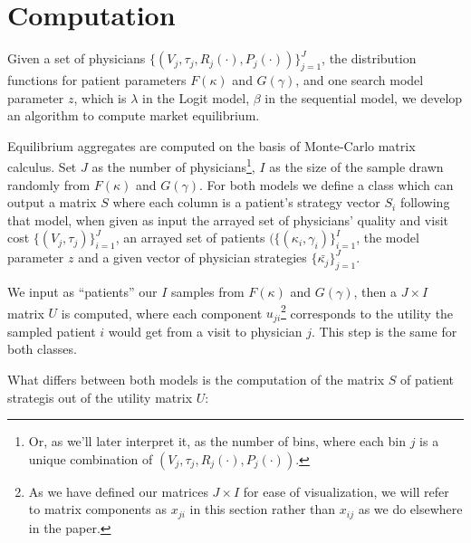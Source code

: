 \documentclass[../main.tex]{subfiles}
\begin{document}
\section{Computation}

Given a set of physicians $\{(V_j, \tau_j, R_j(\cdot),P_j(\cdot))\}_{j =1}^{J}$, the distribution functions for patient parameters $F(\kappa)$ and $G(\gamma)$, and one search model parameter $z$, which is $\lambda$ in the Logit model, $\beta$ in the sequential model, we develop an algorithm to compute market equilibrium.

Equilibrium aggregates are computed on the basis of Monte-Carlo matrix calculus. Set $J$ as the number of physicians\footnote{Or, as we'll later interpret it, as the number of bins, where each bin $j$ is a unique combination of $ (V_j, \tau_j, R_j(\cdot),P_j(\cdot))$.}, $I$ as the size of the sample drawn randomly from $F(\kappa)$ and $G(\gamma)$. For both models we define a class which can output a matrix $S$ where each column is a patient's strategy vector $S_i$ following that model, when given as input the arrayed set of physicians' quality and visit cost $\{(V_j, \tau_j)\}_{i =1}^{J}$, an arrayed set of patients $(\{(\kappa_i,\gamma_i)\}_{i =1}^{I}$, the model parameter $z$ and a given vector of physician strategies $\{\bar{\kappa_j}\}_{j =1}^{J}$.

We input as ``patients'' our $I$ samples from $F(\kappa)$ and $G(\gamma)$, then a $J \times I$ matrix $U$ is computed, where each component $u_{ji}$\footnote{As we have defined our matrices $J \times I$ for ease of visualization, we will refer to matrix components as $x_{ji}$ in this section rather than $x_{ij}$ as we do elsewhere in the paper.} corresponds to the utility the sampled patient $i$ would get from a visit to physician $j$. This step is the same for both classes.

What differs between both models is the computation of the matrix $S$ of patient strategis out of the utility matrix $U$:
\end{document}
